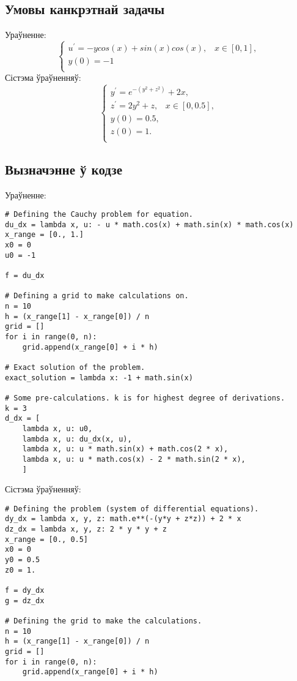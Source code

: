 \subsection*{Умовы канкрэтнай задачы}
Ураўненне:\\
\begin{equation} \label{eq:my-equation}
    \begin{cases}
        u^{\prime} = -y cos(x) + sin(x)cos(x), \hspace{10pt} x \in [0, 1],\\
        y(0) = -1 \\
    \end{cases}
\end{equation}
Сістэма ўраўненняў:
\begin{equation} \label{eq:my-system}
    \begin{cases}
        y^{\prime} = e ^{-(y^2+z^2)} + 2x, \\
        z^{\prime} = 2y^2 + z, \hspace{10pt} x \in [0, 0.5], \\
        y(0) = 0.5, \\
        z(0) = 1. \\
    \end{cases}
\end{equation}

\subsection*{Вызначэнне ў кодзе}
Ураўненне:
{\small
\begin{verbatim}
# Defining the Cauchy problem for equation.
du_dx = lambda x, u: - u * math.cos(x) + math.sin(x) * math.cos(x)
x_range = [0., 1.]
x0 = 0
u0 = -1

f = du_dx

# Defining a grid to make calculations on.
n = 10
h = (x_range[1] - x_range[0]) / n
grid = []
for i in range(0, n):
    grid.append(x_range[0] + i * h)

# Exact solution of the problem.
exact_solution = lambda x: -1 + math.sin(x)

# Some pre-calculations. k is for highest degree of derivations.
k = 3
d_dx = [
    lambda x, u: u0,
    lambda x, u: du_dx(x, u),
    lambda x, u: u * math.sin(x) + math.cos(2 * x),
    lambda x, u: u * math.cos(x) - 2 * math.sin(2 * x),
    ]
\end{verbatim}
}

Сістэма ўраўненняў:
{\small
\begin{verbatim}
# Defining the problem (system of differential equations).
dy_dx = lambda x, y, z: math.e**(-(y*y + z*z)) + 2 * x
dz_dx = lambda x, y, z: 2 * y * y + z
x_range = [0., 0.5]
x0 = 0
y0 = 0.5
z0 = 1.

f = dy_dx
g = dz_dx

# Defining the grid to make the calculations.
n = 10
h = (x_range[1] - x_range[0]) / n
grid = []
for i in range(0, n):
    grid.append(x_range[0] + i * h)
\end{verbatim}
}
